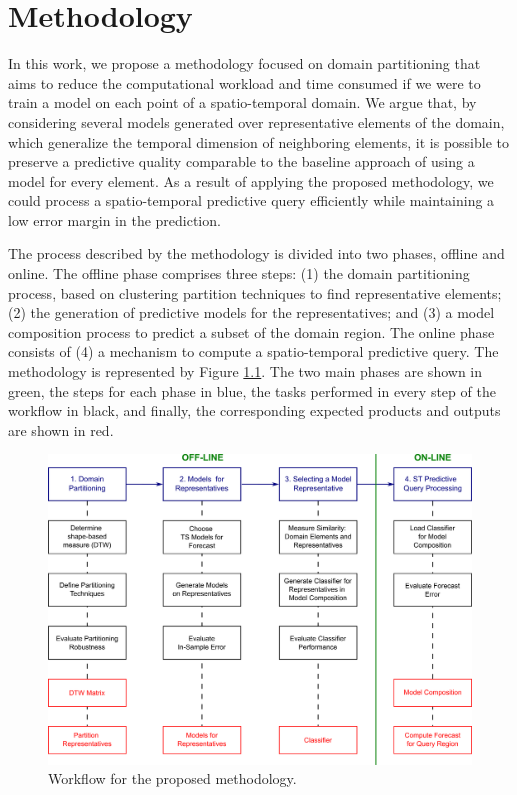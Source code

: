 \chapter[Methodology]{Methodology}
\label{Chapter:Methodology}

In this work, we propose a methodology focused on domain partitioning that aims to reduce the computational workload and time consumed if we were to train a model on each point of a spatio-temporal domain. We argue that, by considering several models generated over representative elements of the domain, which generalize the temporal dimension of neighboring elements, it is possible to preserve a predictive quality comparable to the baseline approach of using a model for every element. As a result of applying the proposed methodology, we could process a spatio-temporal predictive query efficiently while maintaining a low error margin in the prediction.

The process described by the methodology is divided into two phases, offline and online. The offline phase comprises three steps: (1) the domain partitioning process, based on clustering partition techniques to find representative elements; (2) the generation of predictive models for the representatives; and (3) a model composition process to predict a subset of the domain region. The online phase consists of (4) a mechanism to compute a spatio-temporal predictive query. The methodology is represented by Figure \ref{Fig:OverviewMethodology}. The two main phases are shown in green, the steps for each phase in blue, the tasks performed in every step of the workflow in black, and finally, the corresponding expected products and outputs are shown in red. 

\begin{figure}[h]
	\centering
	\includegraphics[scale=0.16]{../Figures/Methodology_Complete}
	\caption{Workflow for the proposed methodology.}
	\label{Fig:OverviewMethodology}
\end{figure}

